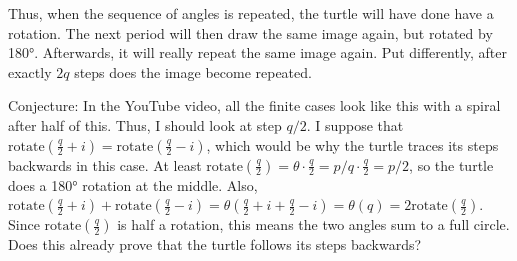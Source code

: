 \documentclass[pdftex,a4paper]{scrartcl}
\newcommand{\rotate}{\text{rotate}}
\begin{document}
Thus, when the sequence of angles is repeated, the turtle will have done have a rotation. The next period will then draw
the same image again, but rotated by 180°. Afterwards, it will really repeat the same image again. Put differently,
after exactly \(2q\) steps does the image become repeated.

Conjecture: In the YouTube video, all the finite cases look like this with a spiral after half of this. Thus, I should
look at step \(q/2\). I suppose that \(\rotate(\frac{q}{2} + i)=\rotate(\frac{q}{2} -i)\), which would be why the turtle
traces its steps backwards in this case. At least \(\rotate(\frac{q}{2})=\theta\cdot \frac{q}{2} = p/q \cdot \frac{q}{2}
= p/2\), so the turtle does a 180° rotation at the middle. Also, \(\rotate(\frac{q}{2} + i)+\rotate(\frac{q}{2}-i) =
\theta(\frac{q}{2}+i + \frac{q}{2}-i) = \theta(q) = 2\rotate(\frac{q}{2})\).  Since \(\rotate(\frac{q}{2})\) is half a
rotation, this means the two angles sum to a full circle. Does this already prove that the turtle follows its steps
backwards?
\end{document}
